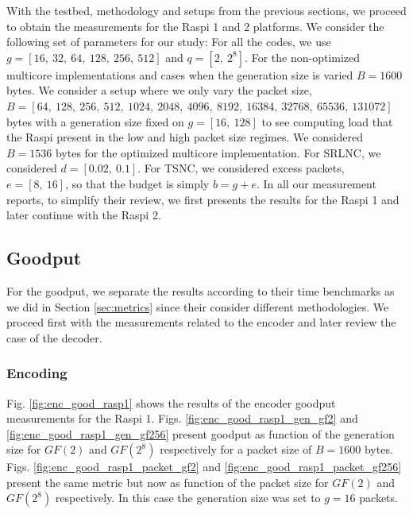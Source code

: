 \label{sec:measurements}

With the testbed, methodology and setups from the previous sections, we
proceed to obtain the measurements for the \ac{Raspi} 1 and 2 platforms.
We consider the following set of parameters for our study:
For all the codes, we use $g = [16,\ 32,\ 64,\ 128,\ 256,\ 512]$
and $q = [2,\ 2^8]$. For the non-optimized multicore implementations
and cases when the generation size is varied $B = 1600$ bytes.
We consider a setup where we only vary the packet size,
$B = [64,\ 128,\ 256,\ 512,\ 1024,\ 2048,\ 4096,\ 8192,\ 16384,\ 32768
,\ 65536,\ 131072]$ bytes with a generation size fixed on $g = [16,\ 128]$
to see computing load that the \ac{Raspi} present in the low and high
packet size regimes. We considered $B = 1536$ bytes for the optimized
multicore implementation. For \ac{SRLNC}, we considered
$d = [0.02,\ 0.1]$. For \ac{TSNC}, we considered excess packets,
$e = [8,\ 16]$, so that the budget is simply $b = g + e$. In all our
measurement reports, to simplify their review, we first presents the
results for the \ac{Raspi} 1 and later continue with the \ac{Raspi} 2.

\subsection{Goodput}
For the goodput, we separate the results according to their time benchmarks
as we did in Section \ref{sec:metrics} since their consider different
methodologies. We proceed first with the measurements related to the encoder
and later review the case of the decoder.

\subsubsection{Encoding}
Fig. \ref{fig:enc_good_rasp1} shows the results of the encoder goodput
measurements for the \ac{Raspi} 1. Figs. \ref{fig:enc_good_rasp1_gen_gf2}
and \ref{fig:enc_good_rasp1_gen_gf256} present goodput as function of the
generation size for $GF(2)$ and $GF(2^8)$ respectively for a packet size
of $B = 1600$ bytes. Figs. \ref{fig:enc_good_rasp1_packet_gf2} and
\ref{fig:enc_good_rasp1_packet_gf256} present the same metric but now as
function of the packet size for $GF(2)$ and $GF(2^8)$ respectively. In this
case the generation size was set to $g = 16$ packets.

